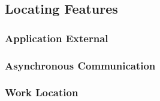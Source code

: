 \subsection{Locating Features}
\subsubsection{Application External}
\subsubsection{Asynchronous Communication}
\subsubsection{Work Location}

